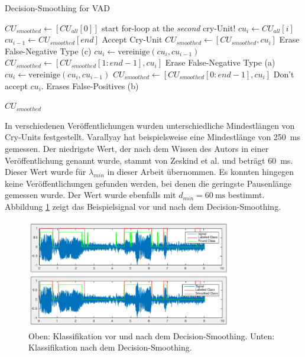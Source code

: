 \begin{algorithm}[h]
	\caption{Decision-Smoothing for VAD}
	\label{alg:decisionSmoothing}
	\begin{algorithmic}[1]
		\State $CU_{smoothed} \gets[CU_{all}[0]] $
		\State \Comment start for-loop at the \emph{second} cry-Unit!
			\State $cu_i \gets CU_{all}[i]$
			\State $cu_{i-1} \gets CU_{smoothed}[end]$
			\State \Comment Accept Cry-Unit
					\State $CU_{smoothed} \gets [CU_{smoothed}, cu_i] $
			\Else
					\State \Comment Erase False-Negative Type (c)
					\State $cu_i \gets \text{vereinige}(cu_i, cu_{i-1})$
					\State $CU_{smoothed} \gets [CU_{smoothed}[1:end-1], cu_i] $
			\EndIf
			\Else
			\State \Comment Erase False-Negative Type (a)
			\State $cu_i \gets \text{vereinige}(cu_i, cu_{i-1})$
			\State $CU_{smoothed} \gets [CU_{smoothed}[0:end-1], cu_i] $
			\Else
			\State \Comment Don't accept $cu_i$. Erases False-Positives (b)
			\EndIf
			\EndIf
		\EndFor
		
		\Return $CU_{smoothed}$
		\EndFunction
		
	\end{algorithmic}
\end{algorithm}

In verschiedenen Veröffentlichungen wurden unterschiedliche Mindestlängen von Cry-Units festgestellt. Varallyay \cite[S. 8]{cry_thesis} hat beispielsweise eine Mindestlänge von \SI{250}{\milli\second} gemessen. Der niedrigste Wert, der nach dem Wissen des Autors in einer Veröffentlichung genannt wurde, stammt von Zeskind et al. \cite[S. 325]{rythmic} und beträgt  \SI{60}{\milli\second}. Dieser Wert wurde für $\lambda_{min}$ in dieser Arbeit übernommen. Es konnten hingegen keine Veröffentlichungen gefunden werden, bei denen die geringste Pausenlänge gemessen wurde. Der Wert wurde ebenfalls mit $d_{min} = \SI{60}{\milli\second}$ bestimmt. Abbildung \ref{img:after-smoothing} zeigt das Beispielsignal vor und nach dem Decision-Smoothing. 

\begin{figure}[h]
	\centering
	\includegraphics[width=0.8\textwidth]{bilder/smoothing04.png}
	\caption{Oben: Klassifikation vor und nach dem Decision-Smoothing. Unten: Klassifikation nach dem Decision-Smoothing.}
	\label{img:after-smoothing}
\end{figure}



